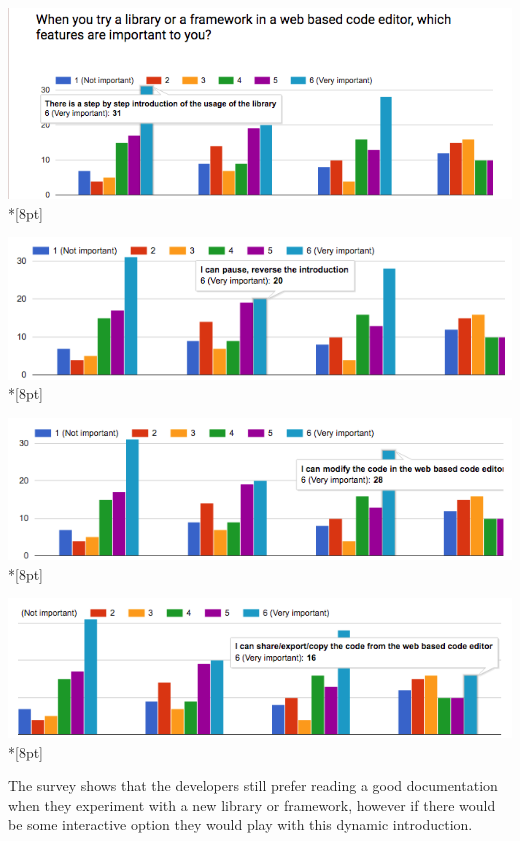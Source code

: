 \documentclass[12pt, a4paper, oneside, openright, medskipamount]{report}
\begin{document}
\includegraphics[width=1\textwidth]{assets/survey-result/features-stepbystep.png}\\*[8pt]

\includegraphics[width=1\textwidth]{assets/survey-result/features-paused.png}\\*[8pt]

\includegraphics[width=1\textwidth]{assets/survey-result/features-modify-code.png}\\*[8pt]

\includegraphics[width=1\textwidth]{assets/survey-result/features-sharing.png}\\*[8pt]

The survey shows that the developers still prefer reading a good documentation when they experiment with a new library or framework, however if there would be some interactive option they would play with this dynamic introduction.
\end{document}
